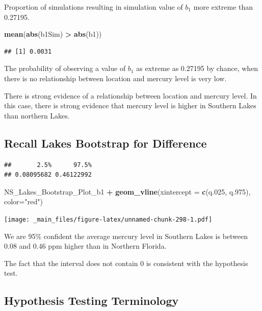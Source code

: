 \documentclass[]{book}
\newenvironment{Shaded}{\begin{snugshade}}{\end{snugshade}}
\newcommand{\KeywordTok}[1]{\textcolor[rgb]{0.13,0.29,0.53}{\textbf{#1}}}
\newcommand{\DataTypeTok}[1]{\textcolor[rgb]{0.13,0.29,0.53}{#1}}
\newcommand{\DecValTok}[1]{\textcolor[rgb]{0.00,0.00,0.81}{#1}}
\newcommand{\StringTok}[1]{\textcolor[rgb]{0.31,0.60,0.02}{#1}}
\newcommand{\OperatorTok}[1]{\textcolor[rgb]{0.81,0.36,0.00}{\textbf{#1}}}
\newcommand{\NormalTok}[1]{#1}
\begin{document}
Proportion of simulations resulting in simulation value of \(b_1\) more
extreme than 0.27195.

\begin{Shaded}
\begin{Highlighting}[]
\KeywordTok{mean}\NormalTok{(}\KeywordTok{abs}\NormalTok{(b1Sim) }\OperatorTok{>}\StringTok{ }\KeywordTok{abs}\NormalTok{(b1))}
\end{Highlighting}
\end{Shaded}

\begin{verbatim}
## [1] 0.0031
\end{verbatim}

The probability of observing a value of \(b_1\) as extreme as 0.27195 by
chance, when there is no relationship between location and mercury level
is very low.

There is strong evidence of a relationship between location and mercury
level. In this case, there is strong evidence that mercury level is
higher in Southern Lakes than northern Lakes.

\subsection{Recall Lakes Bootstrap for
Difference}\label{recall-lakes-bootstrap-for-difference}

\begin{verbatim}
##       2.5%      97.5% 
## 0.08095682 0.46122992
\end{verbatim}

\begin{Shaded}
\begin{Highlighting}[]
\NormalTok{NS_Lakes_Bootstrap_Plot_b1 }\OperatorTok{+}\StringTok{ }\KeywordTok{geom_vline}\NormalTok{(}\DataTypeTok{xintercept =} \KeywordTok{c}\NormalTok{(q.}\DecValTok{025}\NormalTok{, q.}\DecValTok{975}\NormalTok{), }\DataTypeTok{color=}\StringTok{"red"}\NormalTok{)}
\end{Highlighting}
\end{Shaded}

\texttt{[image: \_main\_files/figure-latex/unnamed-chunk-298-1.pdf]}

We are 95\% confident the average mercury level in Southern Lakes is
between 0.08 and 0.46 ppm higher than in Northern Florida.

The fact that the interval does not contain 0 is consistent with the
hypothesis test.

\subsection{Hypothesis Testing
Terminology}\label{hypothesis-testing-terminology}
\end{document}
